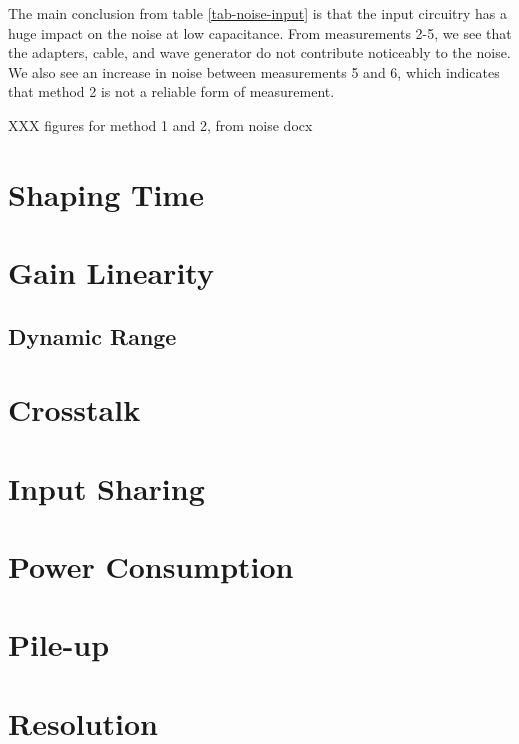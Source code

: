 \documentclass[../main/thesis.tex]{subfiles}
\begin{document}
The main conclusion from table \ref{tab-noise-input} is that the input circuitry has a huge impact on the noise at low capacitance. From measurements 2-5, we see that the adapters, cable, and wave generator do not contribute noticeably to the noise. We also see an increase in noise between measurements 5 and 6, which indicates that method 2 is not a reliable form of measurement. 

XXX figures for method 1 and 2, from noise docx

\section{Shaping Time}
\label{ide-shapingtime}

\section{Gain Linearity}
\label{ide-linearity}

\subsection{Dynamic Range}
\label{ide-dynamicrange}

\section{Crosstalk}
\label{ide-crosstalk}

\section{Input Sharing}
\label{ide-inputshare}

\section{Power Consumption}
\label{ide-power}

\section{Pile-up}
\label{ide-pileup}

\section{Resolution}
\label{ide-resolution}
\end{document}
